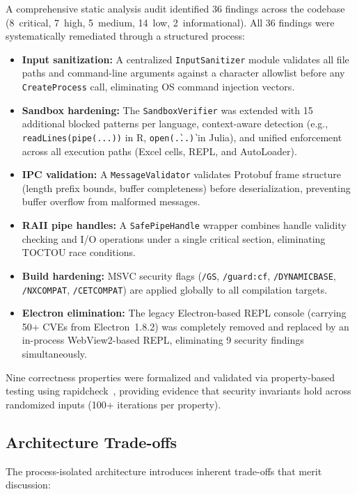 \documentclass[preprint,12pt,authoryear]{elsarticle}
\begin{document}
A comprehensive static analysis audit identified 36 findings across the codebase (8~critical, 7~high, 5~medium, 14~low, 2~informational). All 36 findings were systematically remediated through a structured process:

\begin{itemize}
    \item \textbf{Input sanitization:} A centralized \texttt{InputSanitizer} module validates all file paths and command-line arguments against a character allowlist before any \texttt{CreateProcess} call, eliminating OS command injection vectors.
    \item \textbf{Sandbox hardening:} The \texttt{SandboxVerifier} was extended with 15 additional blocked patterns per language, context-aware detection (e.g., \texttt{readLines(pipe(...))} in R, \texttt{open(\`...\`)} in Julia), and unified enforcement across all execution paths (Excel cells, REPL, and AutoLoader).
    \item \textbf{IPC validation:} A \texttt{MessageValidator} validates Protobuf frame structure (length prefix bounds, buffer completeness) before deserialization, preventing buffer overflow from malformed messages.
    \item \textbf{RAII pipe handles:} A \texttt{SafePipeHandle} wrapper combines handle validity checking and I/O operations under a single critical section, eliminating TOCTOU race conditions.
    \item \textbf{Build hardening:} MSVC security flags (\texttt{/GS}, \texttt{/guard:cf}, \texttt{/DYNAMICBASE}, \texttt{/NXCOMPAT}, \texttt{/CETCOMPAT}) are applied globally to all compilation targets.
    \item \textbf{Electron elimination:} The legacy Electron-based REPL console (carrying 50+ CVEs from Electron~1.8.2) was completely removed and replaced by an in-process WebView2-based REPL, eliminating 9 security findings simultaneously.
\end{itemize}

Nine correctness properties were formalized and validated via property-based testing using rapidcheck~\citep{rapidcheck2023}, providing evidence that security invariants hold across randomized inputs (100+ iterations per property).

\subsection{Architecture Trade-offs}

The process-isolated architecture introduces inherent trade-offs that merit discussion:
\end{document}
